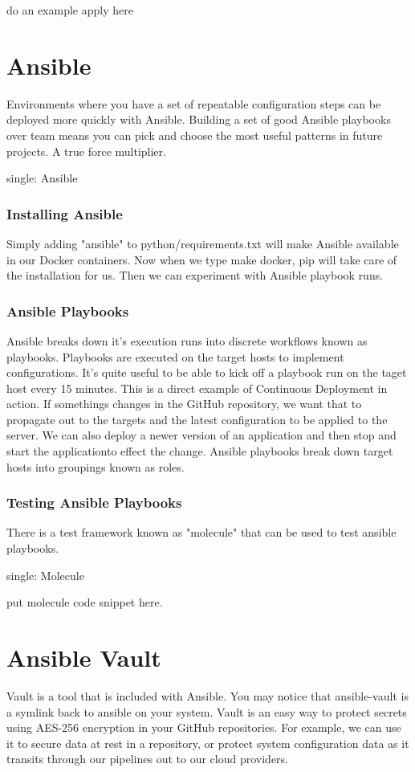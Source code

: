 do an example apply here

\section{Ansible}

\justify
Environments where you have a set of repeatable configuration steps can
be deployed more quickly with Ansible. Building a set of good Ansible
playbooks over team means you can pick and choose the most useful
patterns in future projects. A true force multiplier.

single: Ansible

\subsubsection{Installing Ansible}
\justify
Simply adding "ansible" to python/requirements.txt will make Ansible
available in our Docker containers. Now when we type make docker, pip
will take care of the installation for us. Then we can experiment with
Ansible playbook runs.

\subsubsection{Ansible Playbooks}
\justify
Ansible breaks down it's execution runs into discrete workflows known as
playbooks. Playbooks are executed on the target hosts to implement
configurations. It's quite useful to be able to kick off a playbook run
on the taget host every 15 minutes. This is a direct example of
Continuous Deployment in action. If somethings changes in the GitHub
repository, we want that to propagate out to the targets and the latest
configuration to be applied to the server. We can also deploy a newer
version of an application and then stop and start the applicationto
effect the change.
\justify
Ansible playbooks break down target hosts into groupings known as roles.

\subsubsection{Testing Ansible Playbooks}
\justify
There is a test framework known as "molecule" that can be used to test
ansible playbooks.

single: Molecule

put molecule code snippet here.

\section{Ansible Vault}
\justify
Vault is a tool that is included with Ansible. You may notice that
ansible-vault is a symlink back to ansible on your system. Vault is an
easy way to protect secrets using AES-256 encryption in your GitHub
repositories. For example, we can use it to secure data at rest in a
repository, or protect system configuration data as it transits through
our pipelines out to our cloud providers.

